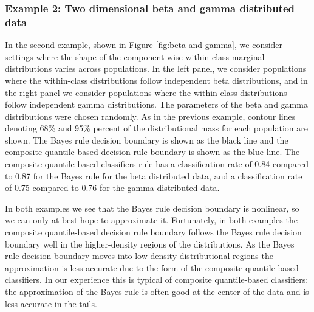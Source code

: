 \subsubsection*{Example 2:  Two dimensional beta and gamma distributed data}
\label{sec:beta-gamma-example}

In the second example, shown in Figure \ref{fig:beta-and-gamma}, we consider
settings where the shape of the component-wise within-class marginal
distributions varies across populations.  In the left panel, we consider
populations where the within-class distributions follow independent beta
distributions, and in the right panel we consider populations where the
within-class distributions follow independent gamma distributions.  The
parameters of the beta and gamma distributions were chosen randomly.  As in the
previous example, contour lines denoting 68\% and 95\% percent of the
distributional mass for each population are shown.  The Bayes rule decision
boundary is shown as the black line and the composite quantile-based decision
rule boundary is shown as the blue line.  The composite quantile-based
classifiers rule has a classification rate of 0.84 compared to 0.87 for the
Bayes rule for the beta distributed data, and a classification rate of 0.75
compared to 0.76 for the gamma distributed data.

In both examples we see that the Bayes rule decision boundary is nonlinear, so
we can only at best hope to approximate it.  Fortunately, in both examples the
composite quantile-based decision rule boundary follows the Bayes rule decision
boundary well in the higher-density regions of the distributions.  As the Bayes
rule decision boundary moves into low-density distributional regions the
approximation is less accurate due to the form of the composite quantile-based
classifiers.  In our experience this is typical of composite quantile-based
classifiers: the approximation of the Bayes rule is often good at the center of
the data and is less accurate in the tails.

